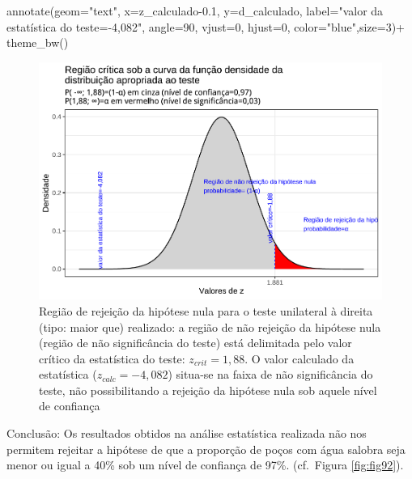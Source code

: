 \documentclass[
]{book}
\newenvironment{Shaded}{\begin{snugshade}}{\end{snugshade}}
\newcommand{\AttributeTok}[1]{\textcolor[rgb]{0.77,0.63,0.00}{#1}}
\newcommand{\DecValTok}[1]{\textcolor[rgb]{0.00,0.00,0.81}{#1}}
\newcommand{\FloatTok}[1]{\textcolor[rgb]{0.00,0.00,0.81}{#1}}
\newcommand{\FunctionTok}[1]{\textcolor[rgb]{0.00,0.00,0.00}{#1}}
\newcommand{\NormalTok}[1]{#1}
\newcommand{\SpecialCharTok}[1]{\textcolor[rgb]{0.00,0.00,0.00}{#1}}
\newcommand{\StringTok}[1]{\textcolor[rgb]{0.31,0.60,0.02}{#1}}
\begin{document}
\begin{Shaded}
\begin{Highlighting}[]
  \FunctionTok{annotate}\NormalTok{(}\AttributeTok{geom=}\StringTok{"text"}\NormalTok{, }\AttributeTok{x=}\NormalTok{z\_calculado}\FloatTok{{-}0.1}\NormalTok{, }\AttributeTok{y=}\NormalTok{d\_calculado, }\AttributeTok{label=}\StringTok{"valor da estatística do teste={-}4,082"}\NormalTok{, }\AttributeTok{angle=}\DecValTok{90}\NormalTok{, }\AttributeTok{vjust=}\DecValTok{0}\NormalTok{, }\AttributeTok{hjust=}\DecValTok{0}\NormalTok{, }\AttributeTok{color=}\StringTok{"blue"}\NormalTok{,}\AttributeTok{size=}\DecValTok{3}\NormalTok{)}\SpecialCharTok{+}
  \FunctionTok{theme\_bw}\NormalTok{()}
\end{Highlighting}
\end{Shaded}

\begin{figure}

{\centering \includegraphics[width=1\linewidth]{apostila_files/figure-latex/fig94-1} 

}

\caption{Região de rejeição da hipótese nula para o teste unilateral à direita (tipo: maior que) realizado: a região de não rejeição da hipótese nula (região de não significância do teste) está delimitada pelo valor crítico da estatística do teste: $z_{crit} = 1,88$. O valor calculado da estatística ($z_{calc}=-4,082$) situa-se na faixa de não significância do teste, não possibilitando a rejeição da hipótese nula sob aquele nível de confiança}\label{fig:fig94}
\end{figure}

\hfill\break

Conclusão: Os resultados obtidos na análise estatística realizada não nos permitem rejeitar a hipótese de que a proporção de poços com água salobra seja menor ou igual a 40\% sob um nível de confiança de 97\%. (cf.~Figura \ref{fig:fig92}).
\end{document}
